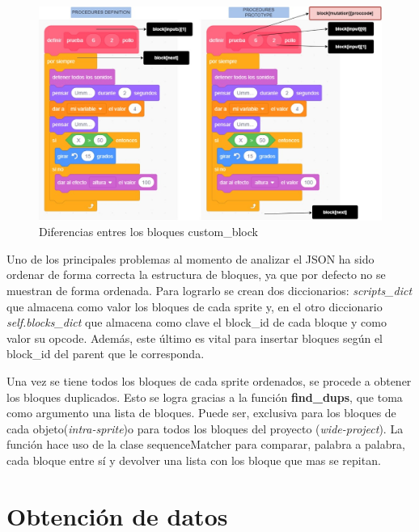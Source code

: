 \documentclass[a4paper, 12pt]{book}
\begin{document}
\begin{figure}[!htb]
  \centering
  \includegraphics[width=13cm, keepaspectratio]{img/scratch_custom.jpg}
  \caption{Diferencias entres los bloques custom\_block}
  \label{fig:scratch_special}
\end{figure}

\newpage 
Uno de los principales problemas al momento de analizar el JSON ha sido ordenar de forma correcta la estructura de bloques, ya que por defecto no se muestran de forma ordenada. Para lograrlo se crean dos diccionarios: \textit{scripts\_dict} que almacena como valor los bloques de cada sprite y, en el otro diccionario \textit{self.blocks\_dict} que almacena como clave el block\_id de cada bloque y como valor su opcode. Además, este último es vital para insertar bloques según el block\_id del parent que le corresponda.

Una vez se tiene todos los bloques de cada sprite ordenados, se procede a obtener los bloques duplicados. Esto se logra gracias a la función \textbf{find\_dups}, que toma como argumento una lista de bloques. Puede ser, exclusiva para los bloques de cada objeto(\textit{intra-sprite})o para todos los bloques del proyecto (\textit{wide-project}). La función hace uso de la clase sequenceMatcher para comparar, palabra a palabra, cada bloque entre sí y devolver una lista con los bloque que mas se repitan. 


\section{Obtención de datos} 
\label{sec:obtenciondatos}
\end{document}
